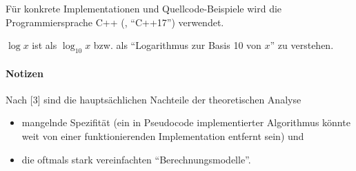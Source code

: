Für konkrete Implementationen und Quellcode-Beispiele wird die Programmiersprache C++ (\cite{ISO-C++17}, \enquote{C++17}) verwendet.

$\log x$ ist als $\log_{10} x$ bzw. als \enquote{Logarithmus zur Basis 10 von $x$} zu verstehen. 

\paragraph{Notizen}

Nach \cite{mcg2012}[3] sind die hauptsächlichen Nachteile der theoretischen Analyse
\begin{itemize}
    \item mangelnde Spezifität (ein in Pseudocode implementierter Algorithmus könnte weit von einer funktionierenden Implementation entfernt sein) und
    \item die oftmals stark vereinfachten \enquote{Berechnungsmodelle}.
\end{itemize}


